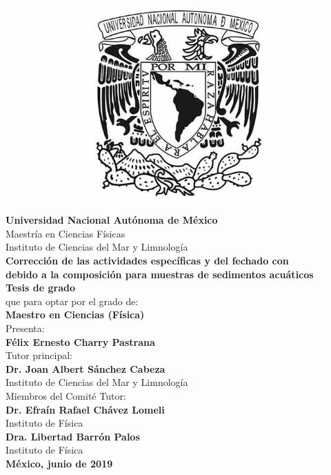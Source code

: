 \pagestyle{empty}
\begin{center}
\begin{figure}
\centering
\includegraphics[scale=0.2]{Imagenes/EscudoUNAM.jpg}
\end{figure}
\textbf{\Large Universidad Nacional Autónoma de México} \\
Maestría en Ciencias Físicas \\
Instituto de Ciencias del Mar y Limnología \\ 
\vspace{2cm}
\textbf{\large Corrección de las actividades específicas y del fechado con \PbCero\, \\
debido a la composición para muestras de sedimentos acuáticos } \\



\vspace{2cm}
\textbf{Tesis de grado} \\
que para optar por el grado de: \\
\textbf{\large Maestro en Ciencias (Física)} \\
\vspace{1cm}
Presenta:  \\
\textbf{\large Félix Ernesto Charry Pastrana} \\
\vspace{1cm}
Tutor principal:  \\
\textbf{\large Dr. Joan Albert Sánchez Cabeza}\\
Instituto de Ciencias del Mar y Limnología  \\
\vspace{1cm}
Miembros del Comité Tutor: \\
\textbf{Dr. Efraín Rafael Chávez Lomeli} \\
Instituto de Física \\
\vspace{0.5 cm}
\textbf{Dra. Libertad Barrón Palos} \\
Instituto de Física\\ 
\vspace{1cm}
\textbf{México, junio de 2019}
\end{center}